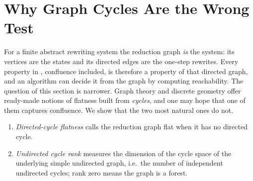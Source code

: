 \section{Why Graph Cycles Are the Wrong Test}
\label{sec:bare-graph-not-enough}

For a finite abstract rewriting system the reduction graph \emph{is} the system: its vertices are the states and its directed edges are the one-step rewrites. Every property in , confluence included, is therefore a property of that directed graph, and an algorithm can decide it from the graph by computing reachability. The question of this section is narrower. Graph theory and discrete geometry offer ready-made notions of flatness built from \emph{cycles}, and one may hope that one of them captures confluence. We show that the two most natural ones do not.

\begin{enumerate}
    \item \emph{Directed-cycle flatness} calls the reduction graph flat when it has no directed cycle.
    \item \emph{Undirected cycle rank} measures the dimension of the cycle space of the underlying simple undirected graph, i.e.\ the number of independent undirected cycles; rank zero means the graph is a forest.
\end{enumerate}


